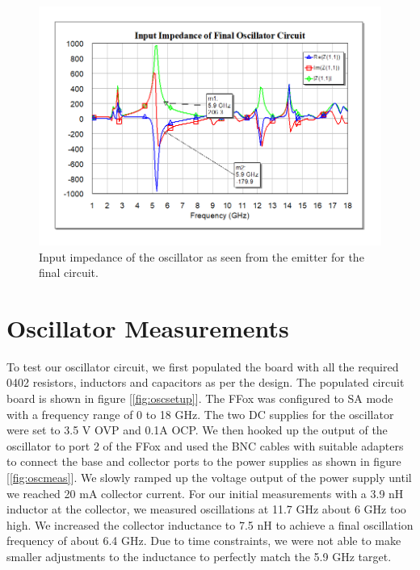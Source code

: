 \documentclass{article}
\begin{document}
\begin{figure}[!htbp]
    \centering
    \includegraphics[scale=0.4]{resonator.png}
    \caption{Input impedance of the oscillator as seen from the emitter for the final circuit.}
    \label{fig:resonator}
\end{figure}


\section*{Oscillator Measurements}\label{sec:oscmeas}

To test our oscillator circuit, we first populated the board with all the required 0402 resistors, inductors and capacitors as per the design. The populated circuit board is shown in figure [\ref{fig:oscsetup}]. The FFox was configured to SA mode with a frequency range of 0 to 18 GHz. The two DC supplies for the oscillator were set to 3.5 V OVP and 0.1A OCP. We then hooked up the output of the oscillator to port 2 of the FFox and used the BNC cables with suitable adapters to connect the base and collector ports to the power supplies as shown in figure [\ref{fig:oscmeas}]. We slowly ramped up the voltage output of the power supply until we reached 20 mA collector current. For our initial measurements with a 3.9 nH inductor at the collector, we measured oscillations at 11.7 GHz about 6 GHz too high. We increased the collector inductance to 7.5 nH to achieve a final oscillation frequency of about 6.4 GHz. Due to time constraints, we were not able to make smaller adjustments to the inductance to perfectly match the 5.9 GHz target.
\end{document}
